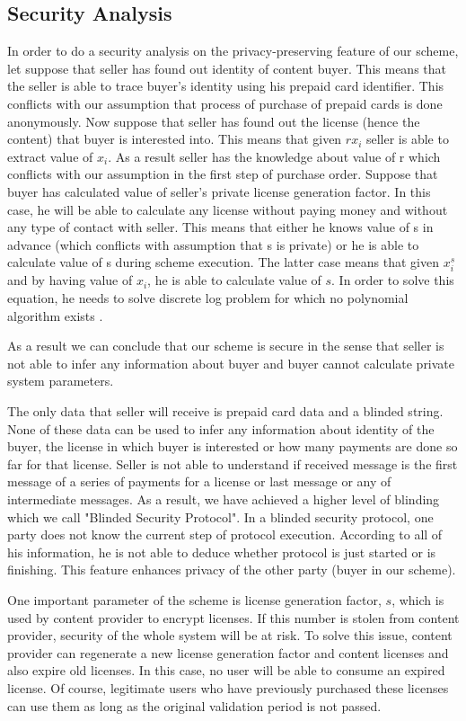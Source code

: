 \documentclass[times]{secauth}
\begin{document}
\subsection{Security Analysis}
\label{sec:security_analysis}
In order to do a security analysis on the privacy-preserving feature of our scheme, let suppose that seller has found out identity of content buyer. This means that the seller is able to trace buyer's identity using his prepaid card identifier. This conflicts with our assumption that process of purchase of prepaid cards is done anonymously.
Now suppose that seller has found out the license (hence the content) that buyer is interested into. This means that given $rx_i$ seller is able to extract value of $x_i$. As a result seller has the knowledge about value of r which conflicts with our assumption in the first step of purchase order.
Suppose that buyer has calculated value of seller's private license generation factor. In this case, he will be able to calculate any license without paying money and without any type of contact with seller. This means that either he knows value of s in advance (which conflicts with assumption that s is private) or he is able to calculate value of s during scheme execution. The latter case means that given $x_i^s$ and by having value of $x_i$, he is able to calculate value of $s$. In order to solve this equation, he needs to solve discrete log problem for which no polynomial algorithm exists \cite{N41, N42}.

As a result we can conclude that our scheme is secure in the sense that seller is not able to infer any information about buyer and buyer cannot calculate private system parameters.

The only data that seller will receive is prepaid card data and a blinded string. None of these data can be used to infer any information about identity of the buyer, the license in which buyer is interested or how many payments are done so far for that license. Seller is not able to understand if received message is the first message of a series of payments for a license or last message or any of intermediate messages. As a result, we have achieved a higher level of blinding which we call "Blinded Security Protocol". In a blinded security protocol, one party does not know the current step of protocol execution. According to all of his information, he is not able to deduce whether protocol is just started or is finishing. This feature enhances privacy of the other party (buyer in our scheme).

One important parameter of the scheme is license generation factor, $s$, which is used by content provider to encrypt licenses. If this number is stolen from content provider, security of the whole system will be at risk. To solve this issue, content provider can regenerate a new license generation factor and content licenses and also expire old licenses. In this case, no user will be able to consume an expired license. Of course, legitimate users who have previously purchased these licenses can use them as long as the original validation period is not passed.
\end{document}
